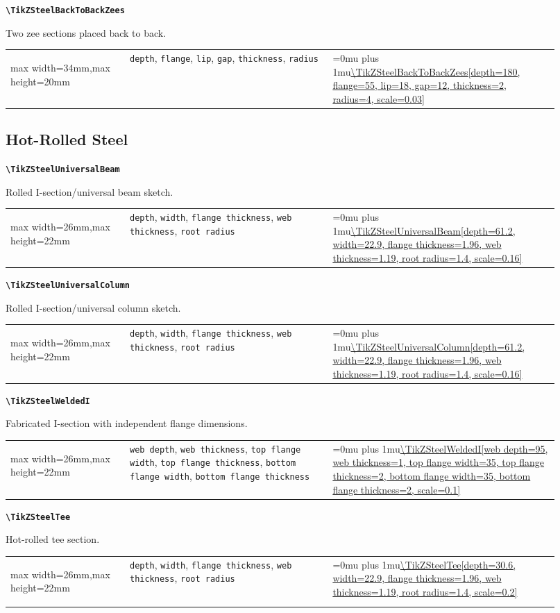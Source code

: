 \documentclass[10pt]{article}
\makeatletter
\newcommand{\command}[1]{\texttt{\textbackslash #1}}
\newcommand{\keyname}[1]{\texttt{#1}}
\newcommand{\CodeInline}[1]{%
  \begingroup
  \ttfamily\scriptsize\raggedright\Urlmuskip=0mu plus 1mu\url{#1}%
  \endgroup
}
\newcommand{\ShapePreview}[1]{%
  \begin{center}
  \begin{adjustbox}{max width=26mm,max height=22mm}
    \begin{tikzpicture}
      #1
    \end{tikzpicture}
  \end{adjustbox}
  \end{center}
}
\newcommand{\WideShapePreview}[1]{%
  \begin{center}
  \begin{adjustbox}{max width=34mm,max height=20mm}
    \begin{tikzpicture}
      #1
    \end{tikzpicture}
  \end{adjustbox}
  \end{center}
}
\newcommand{\ReferenceRow}[6]{%
  \textbf{\command{#1}}\par
  #2\par
  \vspace{2pt}
  \begin{tabular}{@{}p{0.20\linewidth}p{0.34\linewidth}p{0.38\linewidth}@{}}
    #6 & \footnotesize #3 & \CodeInline{#4}
  \end{tabular}
  \par\vspace{4mm}
}
\makeatother
\begin{document}
\ReferenceRow
  {TikZSteelBackToBackZees}
  {Two zee sections placed back to back.}
  {\keyname{depth}, \keyname{flange}, \keyname{lip}, \keyname{gap}, \keyname{thickness}, \keyname{radius}}
  {\TikZSteelBackToBackZees[depth=180, flange=55, lip=18, gap=12, thickness=2, radius=4, scale=0.03]}
  {}
  {\WideShapePreview{\TikZSteelBackToBackZees[depth=180, flange=55, lip=18, gap=12, thickness=2, radius=4, scale=0.03]}}

\subsection{Hot-Rolled Steel}

\ReferenceRow
  {TikZSteelUniversalBeam}
  {Rolled I-section/universal beam sketch.}
  {\keyname{depth}, \keyname{width}, \keyname{flange thickness}, \keyname{web thickness}, \keyname{root radius}}
  {\TikZSteelUniversalBeam[depth=61.2, width=22.9, flange thickness=1.96, web thickness=1.19, root radius=1.4, scale=0.16]}
  {}
  {\ShapePreview{\TikZSteelUniversalBeam[depth=61.2, width=22.9, flange thickness=1.96, web thickness=1.19, root radius=1.4, scale=0.16]}}

\ReferenceRow
  {TikZSteelUniversalColumn}
  {Rolled I-section/universal column sketch.}
  {\keyname{depth}, \keyname{width}, \keyname{flange thickness}, \keyname{web thickness}, \keyname{root radius}}
  {\TikZSteelUniversalColumn[depth=61.2, width=22.9, flange thickness=1.96, web thickness=1.19, root radius=1.4, scale=0.16]}
  {}
  {\ShapePreview{\TikZSteelUniversalColumn[depth=61.2, width=22.9, flange thickness=1.96, web thickness=1.19, root radius=1.4, scale=0.16]}}

\ReferenceRow
  {TikZSteelWeldedI}
  {Fabricated I-section with independent flange dimensions.}
  {\keyname{web depth}, \keyname{web thickness}, \keyname{top flange width}, \keyname{top flange thickness}, \keyname{bottom flange width}, \keyname{bottom flange thickness}}
  {\TikZSteelWeldedI[web depth=95, web thickness=1, top flange width=35, top flange thickness=2, bottom flange width=35, bottom flange thickness=2, scale=0.1]}
  {}
  {\ShapePreview{\TikZSteelWeldedI[web depth=95, web thickness=1, top flange width=35, top flange thickness=2, bottom flange width=35, bottom flange thickness=2, scale=0.1]}}

\ReferenceRow
  {TikZSteelTee}
  {Hot-rolled tee section.}
  {\keyname{depth}, \keyname{width}, \keyname{flange thickness}, \keyname{web thickness}, \keyname{root radius}}
  {\TikZSteelTee[depth=30.6, width=22.9, flange thickness=1.96, web thickness=1.19, root radius=1.4, scale=0.2]}
  {}
  {\ShapePreview{\TikZSteelTee[depth=30.6, width=22.9, flange thickness=1.96, web thickness=1.19, root radius=1.4, scale=0.2]}}
\end{document}
